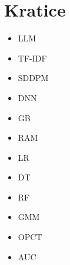 \documentclass[sigconf,nonacm]{acmart}
\begin{document}
\section{Kratice}
\begin{itemize}
	\item \acrfull{LLM}
	\item \acrfull{TF-IDF}
	\item \acrfull{SDDPM}
	\item \acrfull{DNN}
	\item \acrfull{GB}
	\item \acrfull{RAM}
	\item \acrfull{LR}
	\item \acrfull{DT}
	\item \acrfull{RF}
	\item \acrfull{GMM}
	\item \acrfull{OPCT}
	\item \acrfull{AUC}
\end{itemize}

\renewcommand\refname{Literatura} 


\end{document}

